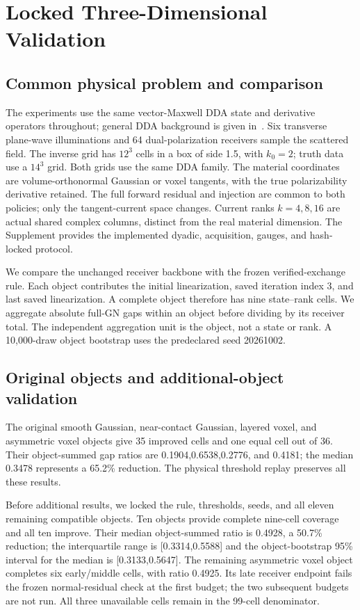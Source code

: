 \section{Locked Three-Dimensional Validation}
\subsection{Common physical problem and comparison}
The experiments use the same vector-Maxwell DDA state and derivative operators throughout; general DDA background is given in~\cite{r11}. Six transverse plane-wave illuminations and 64 dual-polarization receivers sample the scattered field. The inverse grid has $12^3$ cells in a box of side 1.5, with $k_0=2$; truth data use a $14^3$ grid. Both grids use the same DDA family. The material coordinates are volume-orthonormal Gaussian or voxel tangents, with the true polarizability derivative retained. The full forward residual and injection are common to both policies; only the tangent-current space changes. Current ranks $k=4,8,16$ are actual shared complex columns, distinct from the real material dimension. The Supplement provides the implemented dyadic, acquisition, gauges, and hash-locked protocol.

We compare the unchanged receiver backbone with the frozen verified-exchange rule. Each object contributes the initial linearization, saved iteration index 3, and last saved linearization. A complete object therefore has nine state--rank cells. We aggregate absolute full-GN gaps within an object before dividing by its receiver total. The independent aggregation unit is the object, not a state or rank. A 10,000-draw object bootstrap uses the predeclared seed 20261002.

\subsection{Original objects and additional-object validation}
The original smooth Gaussian, near-contact Gaussian, layered voxel, and asymmetric voxel objects give 35 improved cells and one equal cell out of 36. Their object-summed gap ratios are 0.1904,0.6538,0.2776, and 0.4181; the median 0.3478 represents a 65.2\% reduction. The physical threshold replay preserves all these results.

Before additional results, we locked the rule, thresholds, seeds, and all eleven remaining compatible objects. Ten objects provide complete nine-cell coverage and all ten improve. Their median object-summed ratio is 0.4928, a 50.7\% reduction; the interquartile range is [0.3314,0.5588] and the object-bootstrap 95\% interval for the median is [0.3133,0.5647]. The remaining asymmetric voxel object completes six early/middle cells, with ratio 0.4925. Its late receiver endpoint fails the frozen normal-residual check at the first budget; the two subsequent budgets are not run. All three unavailable cells remain in the 99-cell denominator.

